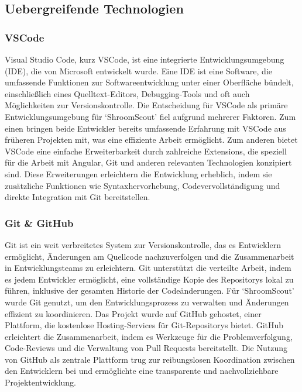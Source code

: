 \documentclass[../main.tex]{subfiles} %
\begin{document}
\subsection{Uebergreifende Technologien} %

\subsubsection{VSCode}

Visual Studio Code, kurz VSCode, ist eine integrierte Entwicklungsumgebung (IDE), die von Microsoft entwickelt wurde.
Eine IDE ist eine Software, die umfassende Funktionen zur Softwareentwicklung unter einer Oberfläche bündelt, einschließlich
eines Quelltext-Editors, Debugging-Tools und oft auch Möglichkeiten zur Versionskontrolle. Die Entscheidung für VSCode als
primäre Entwicklungsumgebung für `ShroomScout' fiel aufgrund mehrerer Faktoren. Zum einen bringen beide Entwickler bereits
umfassende Erfahrung mit VSCode aus früheren Projekten mit, was eine effiziente Arbeit ermöglicht. Zum anderen bietet VSCode
eine einfache Erweiterbarkeit durch zahlreiche Extensions, die speziell für die Arbeit mit Angular, Git und anderen relevanten
Technologien konzipiert sind. Diese Erweiterungen erleichtern die Entwicklung erheblich, indem sie zusätzliche Funktionen wie
Syntaxhervorhebung, Codevervollständigung und direkte Integration mit Git bereitstellen.

\subsubsection{Git \& GitHub}

Git ist ein weit verbreitetes System zur Versionskontrolle, das es Entwicklern ermöglicht, Änderungen am Quellcode nachzuverfolgen
und die Zusammenarbeit in Entwicklungsteams zu erleichtern. Git unterstützt die verteilte Arbeit, indem es jedem Entwickler ermöglicht,
eine vollständige Kopie des Repositorys lokal zu führen, inklusive der gesamten Historie der Codeänderungen. Für `ShroomScout' wurde
Git genutzt, um den Entwicklungsprozess zu verwalten und Änderungen effizient zu koordinieren. Das Projekt wurde auf GitHub gehostet,
einer Plattform, die kostenlose Hosting-Services für Git-Repositorys bietet. GitHub erleichtert die Zusammenarbeit, indem es Werkzeuge
für die Problemverfolgung, Code-Reviews und die Verwaltung von Pull Requests bereitstellt. Die Nutzung von GitHub als zentrale Plattform
trug zur reibungslosen Koordination zwischen den Entwicklern bei und ermöglichte eine transparente und nachvollziehbare Projektentwicklung.
\end{document}
